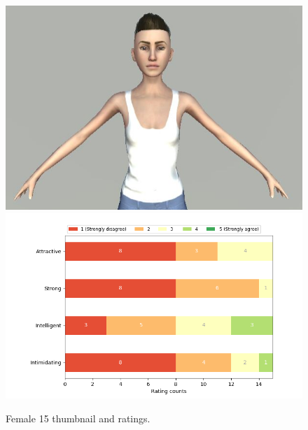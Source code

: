 \begin{figure}[H]
  \includegraphics[width=\linewidth]{Images/Females/15.JPG}
\endminipage\hfill
{}
  \includegraphics[width=\linewidth]{Survey/FRatings/avatar_f15.png}
\endminipage\hfill
\caption{Female 15 thumbnail and ratings.}
\end{figure}
